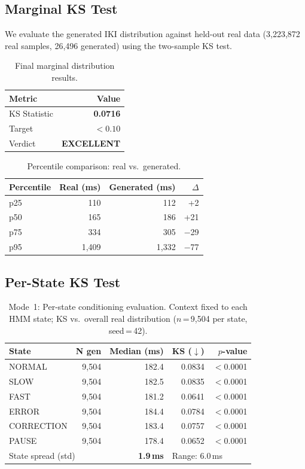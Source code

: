 \documentclass[sigconf,nonacm]{acmart}
\begin{document}
\subsection{Marginal KS Test}

We evaluate the generated IKI distribution against held-out real data
(3,223,872 real samples, 26,496 generated) using the two-sample KS test.

\begin{table}[t]
\centering
\caption{Final marginal distribution results.}
\begin{tabular}{lr}
\toprule
Metric & Value \\
\midrule
KS Statistic        & \textbf{0.0716} \\
Target              & $< 0.10$ \\
Verdict             & \textbf{EXCELLENT} \\
\bottomrule
\end{tabular}
\label{tab:ks}
\end{table}

\begin{table}[t]
\centering
\caption{Percentile comparison: real vs.\ generated.}
\begin{tabular}{lrrr}
\toprule
Percentile & Real (ms) & Generated (ms) & $\Delta$ \\
\midrule
p25 & 110 & 112 & +2 \\
p50 & 165 & 186 & +21 \\
p75 & 334 & 305 & $-$29 \\
p95 & 1{,}409 & 1{,}332 & $-$77 \\
\bottomrule
\end{tabular}
\label{tab:percentile}
\end{table}

\subsection{Per-State KS Test}

\begin{table}[t]
\centering
\caption{Mode~1: Per-state conditioning evaluation.
  Context fixed to each HMM state; KS vs.\ overall real distribution
  ($n$\,=\,9{,}504 per state, seed\,=\,42).}
\begin{tabular}{lrrrr}
\toprule
State & N gen & Median (ms) & KS ($\downarrow$) & $p$-value \\
\midrule
NORMAL     & 9,504 & 182.4 & 0.0834 & $<$0.0001 \\
SLOW       & 9,504 & 182.5 & 0.0835 & $<$0.0001 \\
FAST       & 9,504 & 181.2 & 0.0641 & $<$0.0001 \\
ERROR      & 9,504 & 184.4 & 0.0784 & $<$0.0001 \\
CORRECTION & 9,504 & 183.4 & 0.0757 & $<$0.0001 \\
PAUSE      & 9,504 & 178.4 & 0.0652 & $<$0.0001 \\
\midrule
\multicolumn{2}{l}{State spread (std)} & \textbf{1.9\,ms} & \multicolumn{2}{l}{Range: 6.0\,ms} \\
\bottomrule
\end{tabular}
\label{tab:perstate}
\end{table}
\end{document}
